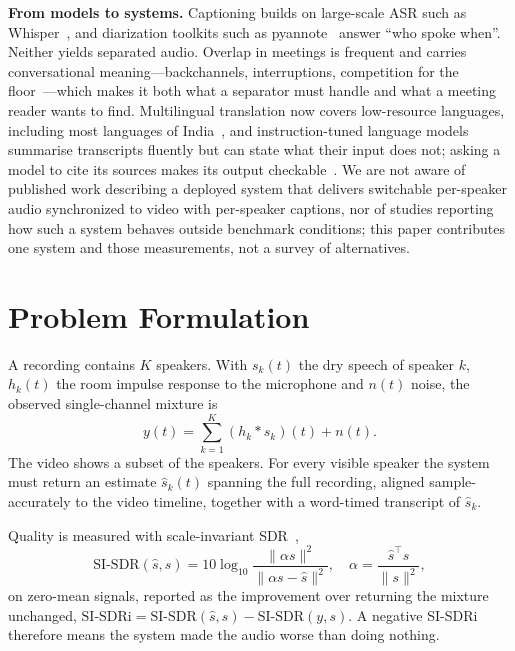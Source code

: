 \documentclass[conference]{IEEEtran}
\newcommand{\sisdr}{\mathrm{SI\text{-}SDR}}
\begin{document}
\textbf{From models to systems.} Captioning builds on large-scale ASR such as Whisper~\cite{radford2023whisper}, and diarization toolkits such as pyannote~\cite{bredin2020pyannote} answer ``who spoke when''. Neither yields separated audio. Overlap in meetings is frequent and carries conversational meaning---backchannels, interruptions, competition for the floor~\cite{shriberg2001overlap}---which makes it both what a separator must handle and what a meeting reader wants to find. Multilingual translation now covers low-resource languages, including most languages of India~\cite{nllb2024}, and instruction-tuned language models~\cite{qwen2025} summarise transcripts fluently but can state what their input does not; asking a model to cite its sources makes its output checkable~\cite{gao2023alce}. We are not aware of published work describing a deployed system that delivers switchable per-speaker audio synchronized to video with per-speaker captions, nor of studies reporting how such a system behaves outside benchmark conditions; this paper contributes one system and those measurements, not a survey of alternatives.

\section{Problem Formulation}

A recording contains $K$ speakers. With $s_k(t)$ the dry speech of speaker $k$, $h_k(t)$ the room impulse response to the microphone and $n(t)$ noise, the observed single-channel mixture is
\begin{equation}
y(t) = \sum_{k=1}^{K} (h_k * s_k)(t) + n(t).
\label{eq:mixture}
\end{equation}
The video shows a subset of the speakers. For every visible speaker the system must return an estimate $\hat{s}_k(t)$ spanning the full recording, aligned sample-accurately to the video timeline, together with a word-timed transcript of $\hat{s}_k$.

Quality is measured with scale-invariant SDR~\cite{leroux2019sdr},
\begin{equation}
\sisdr(\hat{s}, s) = 10\log_{10}\frac{\lVert \alpha s\rVert^2}{\lVert \alpha s - \hat{s}\rVert^2},\quad
\alpha = \frac{\hat{s}^\top s}{\lVert s\rVert^2},
\label{eq:sisdr}
\end{equation}
on zero-mean signals, reported as the improvement over returning the mixture unchanged, $\mathrm{SI\text{-}SDRi} = \sisdr(\hat{s}, s) - \sisdr(y, s)$. A negative SI-SDRi therefore means the system made the audio worse than doing nothing.
\end{document}
